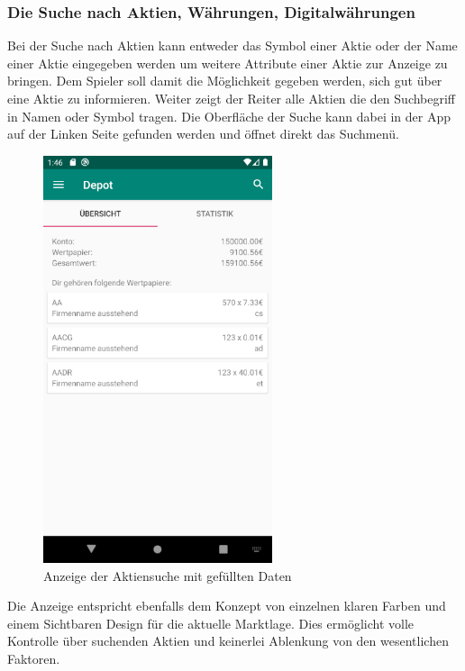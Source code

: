 \documentclass[10pt]{scrartcl}
\begin{document}
\subsubsection{Die Suche nach Aktien, Währungen, Digitalwährungen}

Bei der Suche nach Aktien kann entweder das Symbol einer Aktie oder der Name einer Aktie eingegeben werden um weitere Attribute einer Aktie zur Anzeige zu bringen. Dem Spieler soll damit die Möglichkeit gegeben werden, sich gut über eine Aktie zu informieren. Weiter zeigt der Reiter alle Aktien die den Suchbegriff in Namen oder Symbol tragen. Die Oberfläche der Suche kann dabei in der App auf der Linken Seite gefunden werden und öffnet direkt das Suchmenü.

\begin{figure}[H]
	\centering
	\includegraphics[width=0.6\textwidth]{Bilder/Prsi/einstieg.png}
	\caption{Anzeige der Aktiensuche mit gefüllten Daten}
\end{figure}

Die Anzeige entspricht ebenfalls dem Konzept von einzelnen klaren Farben und einem Sichtbaren Design für die aktuelle Marktlage. Dies ermöglicht volle Kontrolle über suchenden Aktien und keinerlei Ablenkung von den wesentlichen Faktoren.
\end{document}
